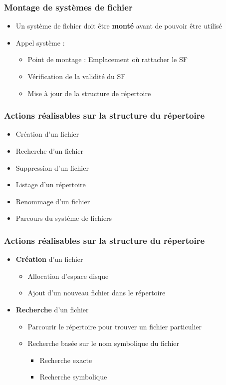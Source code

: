 \begin{frame}
\frametitle{Montage de systèmes de fichier}
\begin{itemize}
\item Un système de fichier doit être \textbf{monté} avant de pouvoir être utilisé
\item Appel système :
\begin{itemize}
\item Point de montage : Emplacement où rattacher le SF
\item Vérification de la validité du SF
\item Mise à jour de la structure de répertoire
\end{itemize}
\end{itemize}
\end{frame}

\begin{frame}
\frametitle{Actions réalisables sur la structure du répertoire}
\begin{itemize}
\item Création d'un fichier
\item Recherche d'un fichier
\item Suppression d'un fichier
\item Listage d'un répertoire
\item Renommage d'un fichier
\item Parcours du système de fichiers
\end{itemize}
\end{frame}

\begin{frame}
\frametitle{Actions réalisables sur la structure du répertoire}
\begin{itemize}
\item \textbf{Création} d'un fichier
\begin{itemize}
\item Allocation d'espace disque
\item Ajout d'un nouveau fichier dans le répertoire
\end{itemize}
\item \textbf{Recherche} d'un fichier
\begin{itemize}
\item Parcourir le répertoire pour trouver un fichier particulier
\item Recherche basée sur le nom symbolique du fichier
\begin{itemize}
\item Recherche exacte
\item Recherche symbolique
\end{itemize}
\end{itemize}
\end{itemize}
\end{frame}


